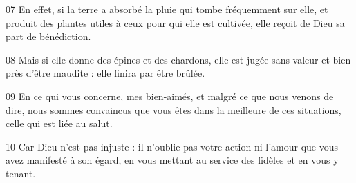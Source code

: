
07 En effet, si la terre a absorbé la pluie qui tombe fréquemment sur elle, et produit des plantes utiles à ceux pour qui elle est cultivée, elle reçoit de Dieu sa part de bénédiction.

08 Mais si elle donne des épines et des chardons, elle est jugée sans valeur et bien près d’être maudite : elle finira par être brûlée.

09 En ce qui vous concerne, mes bien-aimés, et malgré ce que nous venons de dire, nous sommes convaincus que vous êtes dans la meilleure de ces situations, celle qui est liée au salut.

10 Car Dieu n’est pas injuste : il n’oublie pas votre action ni l’amour que vous avez manifesté à son égard, en vous mettant au service des fidèles et en vous y tenant.